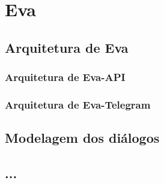 \chapter{Eva }


\section{Arquitetura de Eva}


\subsection{Arquitetura de Eva-API}

\subsection{Arquitetura de Eva-Telegram}


\section{Modelagem dos diálogos}


\section{...}
